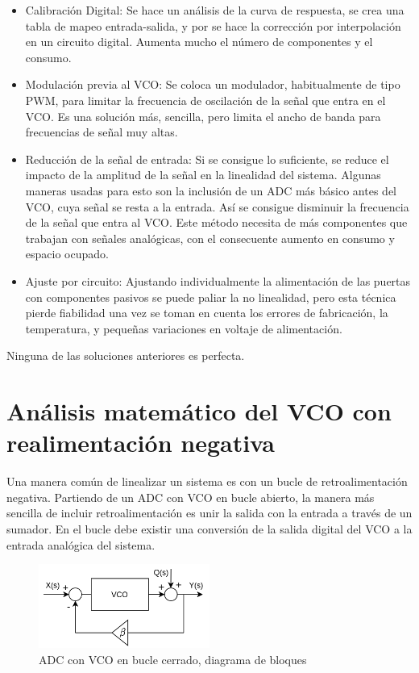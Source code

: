 \documentclass[12pt]{report} %
\begin{document}
	\begin{itemize}
		\item Calibración Digital: Se hace un análisis de la curva de respuesta, se crea una tabla de mapeo entrada-salida, y por se hace la corrección por interpolación en un circuito digital. Aumenta mucho el número de componentes y el consumo.
		
		\item Modulación previa al VCO: Se coloca un modulador, habitualmente de tipo PWM, para limitar la frecuencia de oscilación de la señal que entra en el VCO. Es una solución más, sencilla, pero limita el ancho de banda para frecuencias de señal muy altas.
		
		\item Reducción de la señal de entrada: Si se consigue lo suficiente, se reduce el impacto de la amplitud de la señal en la linealidad del sistema. Algunas maneras usadas para esto son la inclusión de un ADC más básico antes del VCO, cuya señal se resta a la entrada. Así se consigue disminuir la frecuencia de la señal que entra al VCO. Este método necesita de más componentes que trabajan con señales analógicas, con el consecuente aumento en consumo y espacio ocupado.
		
		\item Ajuste por circuito: Ajustando individualmente la alimentación de las puertas con componentes pasivos se puede paliar la no linealidad, pero esta técnica pierde fiabilidad una vez se toman en cuenta los errores de fabricación, la temperatura, y pequeñas variaciones en voltaje de alimentación.
	\end{itemize}
	
	Ninguna de las soluciones anteriores es perfecta. %
	
	\section{Análisis matemático del VCO con realimentación negativa}
	
	Una manera común de linealizar un sistema es con un bucle de retroalimentación negativa. Partiendo de un ADC con VCO en bucle abierto, la manera más sencilla de incluir retroalimentación es unir la salida con la entrada a través de un sumador. En el bucle debe existir una conversión de la salida digital del VCO a la entrada analógica del sistema.

	\begin{figure}[H]
		\includegraphics[width=0.5\textwidth]{vco-diagram-closed-loop.png}
		\caption[ADC con VCO en bucle abierto, diagrama de bloques]{ADC con VCO en bucle cerrado, diagrama de bloques}
		\label{fig:vco-diagram-closed-loop.png}
	\end{figure}
	
\end{document}
